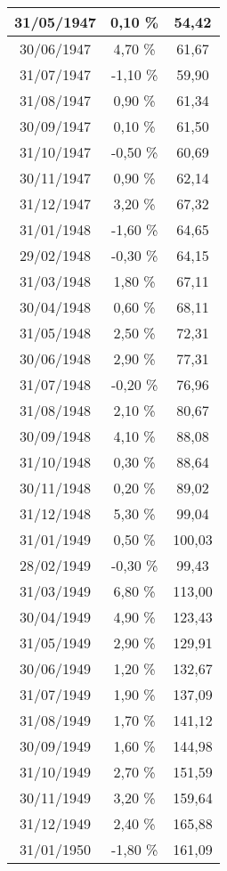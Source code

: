 \begin{center}
\begin{longtable}{|c|c|c|}
31/05/1947 & 0,10 \% & 54,42  \\ \hline
30/06/1947 & 4,70 \% & 61,67  \\ \hline
31/07/1947 & -1,10 \% & 59,90  \\ \hline
31/08/1947 & 0,90 \% & 61,34  \\ \hline
30/09/1947 & 0,10 \% & 61,50  \\ \hline
31/10/1947 & -0,50 \% & 60,69  \\ \hline
30/11/1947 & 0,90 \% & 62,14  \\ \hline
31/12/1947 & 3,20 \% & 67,32  \\ \hline
31/01/1948 & -1,60 \% & 64,65  \\ \hline
29/02/1948 & -0,30 \% & 64,15  \\ \hline
31/03/1948 & 1,80 \% & 67,11  \\ \hline
30/04/1948 & 0,60 \% & 68,11  \\ \hline
31/05/1948 & 2,50 \% & 72,31  \\ \hline
30/06/1948 & 2,90 \% & 77,31  \\ \hline
31/07/1948 & -0,20 \% & 76,96  \\ \hline
31/08/1948 & 2,10 \% & 80,67  \\ \hline
30/09/1948 & 4,10 \% & 88,08  \\ \hline
31/10/1948 & 0,30 \% & 88,64  \\ \hline
30/11/1948 & 0,20 \% & 89,02  \\ \hline
31/12/1948 & 5,30 \% & 99,04  \\ \hline
31/01/1949 & 0,50 \% & 100,03  \\ \hline
28/02/1949 & -0,30 \% & 99,43  \\ \hline
31/03/1949 & 6,80 \% & 113,00  \\ \hline
30/04/1949 & 4,90 \% & 123,43  \\ \hline
31/05/1949 & 2,90 \% & 129,91  \\ \hline
30/06/1949 & 1,20 \% & 132,67  \\ \hline
31/07/1949 & 1,90 \% & 137,09  \\ \hline
31/08/1949 & 1,70 \% & 141,12  \\ \hline
30/09/1949 & 1,60 \% & 144,98  \\ \hline
31/10/1949 & 2,70 \% & 151,59  \\ \hline
30/11/1949 & 3,20 \% & 159,64  \\ \hline
31/12/1949 & 2,40 \% & 165,88  \\ \hline
31/01/1950 & -1,80 \% & 161,09  \\ \hline

\end{longtable}
\end{center}
